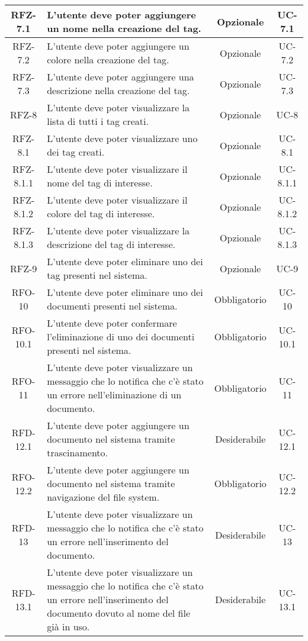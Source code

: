 \begin{xltabular}{\textwidth}{| c | X | c | c |}
    \hline
    RFZ-7.1 & L’utente deve poter aggiungere un nome nella creazione del tag. & Opzionale & UC-7.1 \\
    \hline
    RFZ-7.2 & L’utente deve poter aggiungere un colore nella creazione del tag. & Opzionale & UC-7.2 \\
    \hline
    RFZ-7.3 & L’utente deve poter aggiungere una descrizione nella creazione del tag. & Opzionale & UC-7.3 \\
    \hline
    RFZ-8 & L’utente deve poter visualizzare la lista di tutti i tag creati. & Opzionale & UC-8 \\
    \hline
    RFZ-8.1 & L’utente deve poter visualizzare uno dei tag creati. & Opzionale & UC-8.1 \\
    \hline
    RFZ-8.1.1 & L’utente deve poter visualizzare il nome del tag di interesse. & Opzionale & UC-8.1.1 \\
    \hline
    RFZ-8.1.2 & L’utente deve poter visualizzare il colore del tag di interesse. & Opzionale & UC-8.1.2 \\
    \hline
    RFZ-8.1.3 & L’utente deve poter visualizzare la descrizione del tag di interesse. & Opzionale & UC-8.1.3 \\
    \hline
    RFZ-9 & L’utente deve poter eliminare uno dei tag presenti nel sistema. & Opzionale & UC-9 \\
    \hline
    RFO-10 & L’utente deve poter eliminare uno dei documenti presenti nel sistema. & Obbligatorio & UC-10 \\
    \hline
    RFO-10.1 & L’utente deve poter confermare l’eliminazione di uno dei documenti presenti nel sistema. & Obbligatorio & UC-10.1 \\
    \hline
    RFO-11 & L'utente deve poter visualizzare un messaggio che lo notifica che c'è stato un errore nell'eliminazione di un documento. & Obbligatorio & UC-11 \\
    \hline
    RFD-12.1 & L’utente deve poter aggiungere un documento nel sistema tramite trascinamento. & Desiderabile & UC-12.1 \\
    \hline
    RFO-12.2 & L’utente deve poter aggiungere un documento nel sistema tramite navigazione del file system. & Obbligatorio & UC-12.2 \\
    \hline
    RFD-13 & L'utente deve poter visualizzare un messaggio che lo notifica che c'è stato un errore nell'inserimento del documento. & Desiderabile & UC-13 \\
    \hline
    RFD-13.1 & L'utente deve poter visualizzare un messaggio che lo notifica che c'è stato un errore nell'inserimento del documento dovuto al nome del file già in uso. & Desiderabile & UC-13.1 \\

\end{xltabular}
